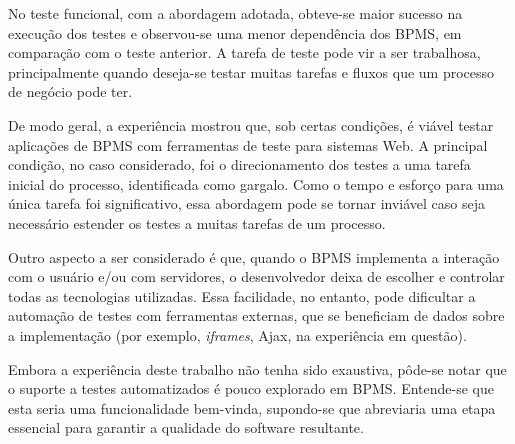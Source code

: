 \documentclass[12pt]{article}
\begin{document}
No teste funcional, com a abordagem adotada, obteve-se maior sucesso na execução dos testes e observou-se uma menor dependência dos BPMS, em comparação com o teste anterior. A tarefa de teste pode vir a ser trabalhosa, principalmente quando deseja-se testar muitas tarefas e fluxos que um processo de negócio pode ter.

De modo geral, a experiência mostrou que, sob certas condições, é viável testar aplicações de BPMS com ferramentas de teste para sistemas Web. A principal condição, no caso considerado, foi o direcionamento dos testes a uma tarefa inicial do processo, identificada como gargalo. Como o tempo e esforço para uma única tarefa foi significativo, essa abordagem pode se tornar inviável caso seja necessário estender os testes a muitas tarefas de um processo.

Outro aspecto a ser considerado é que, quando o BPMS implementa a interação com o usuário e/ou com servidores, o desenvolvedor deixa de escolher e controlar todas as tecnologias utilizadas. Essa facilidade, no entanto, pode dificultar a automação de testes com ferramentas externas, que se beneficiam de dados sobre a implementação (por exemplo, \emph{iframes}, Ajax, na experiência em questão).

Embora a experiência deste trabalho não tenha sido exaustiva, pôde-se notar que o suporte a testes automatizados é pouco explorado em BPMS. Entende-se que esta seria uma funcionalidade bem-vinda, supondo-se que abreviaria uma etapa essencial para garantir a qualidade do software resultante. 






\end{document}
